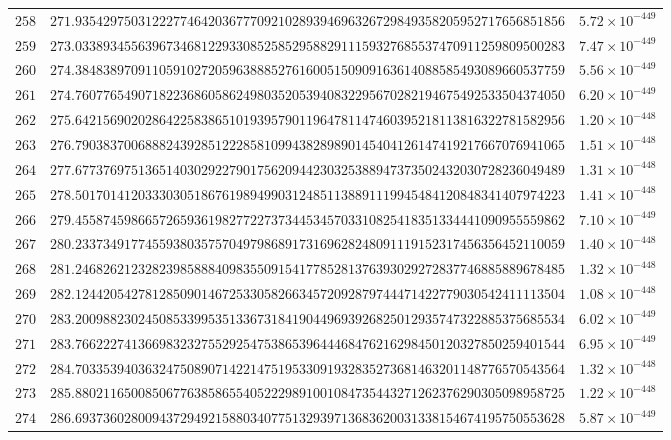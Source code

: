 \documentclass[12pt,reqno]{amsart}
\theoremstyle{remark}
\begin{document}
\begin{longtable}{clc}
$258$ & $271.9354297503122277464203677709210289394696326729849358205952717656851856$ & $5.72\times 10^{-449}$ \\
$259$ & $273.0338934556396734681229330852585295882911159327685537470911259809500283$ & $7.47\times 10^{-449}$ \\
$260$ & $274.3848389709110591027205963888527616005150909163614088585493089660537759$ & $5.56\times 10^{-449}$ \\
$261$ & $274.7607765490718223686058624980352053940832295670282194675492533504374050$ & $6.20\times 10^{-449}$ \\
$262$ & $275.6421569020286422583865101939579011964781147460395218113816322781582956$ & $1.20\times 10^{-448}$ \\
$263$ & $276.7903837006888243928512228581099438289890145404126147419217667076941065$ & $1.51\times 10^{-448}$ \\
$264$ & $277.6773769751365140302922790175620944230325388947373502432030728236049489$ & $1.31\times 10^{-448}$ \\
$265$ & $278.5017014120333030518676198949903124851138891119945484120848341407974223$ & $1.41\times 10^{-448}$ \\
$266$ & $279.4558745986657265936198277227373445345703310825418351334441090955559862$ & $7.10\times 10^{-449}$ \\
$267$ & $280.2337349177455938035757049798689173169628248091119152317456356452110059$ & $1.40\times 10^{-448}$ \\
$268$ & $281.2468262123282398588840983550915417785281376393029272837746885889678485$ & $1.32\times 10^{-448}$ \\
$269$ & $282.1244205427812850901467253305826634572092879744471422779030542411113504$ & $1.08\times 10^{-448}$ \\
$270$ & $283.2009882302450853399535133673184190449693926825012935747322885375685534$ & $6.02\times 10^{-449}$ \\
$271$ & $283.7662227413669832327552925475386539644468476216298450120327850259401544$ & $6.95\times 10^{-449}$ \\
$272$ & $284.7033539403632475089071422147519533091932835273681463201148776570543564$ & $1.32\times 10^{-448}$ \\
$273$ & $285.8802116500850677638586554052229891001084735443271262376290305098958725$ & $1.22\times 10^{-448}$ \\
$274$ & $286.6937360280094372949215880340775132939713683620031338154674195750553628$ & $5.87\times 10^{-449}$ \\

\end{longtable}
\end{document}
